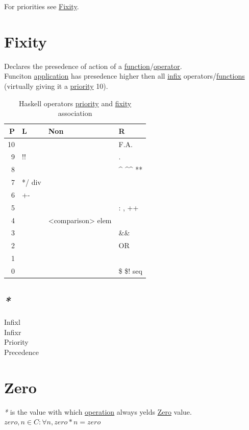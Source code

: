 \documentclass[a4paper,14pt,oneside]{book}
\begin{document}
For priorities see \hyperref[org02a84e2]{Fixity}.\\

\section{\label{org02a84e2}Fixity}
\label{sec:org932e651}
Declares the presedence of action of a \hyperref[org13e0181]{function}/\hyperref[org6dec081]{operator}.\\

Funciton \hyperref[orgbc1fe73]{application} has presedence higher then all \hyperref[org87504c8]{infix} operators/\hyperref[org41df67c]{functions} (virtually giving it a \hyperref[orgb5ff9f2]{priority} 10).\\

\begin{table}[htbp]
\caption{\label{tab--haskell-operator-priority-fixity-association}Haskell operators \hyperref[orgb5ff9f2]{priority} and \hyperref[org02a84e2]{fixity} association}
\centering
\begin{tabular}{rlll}
P & L & Non & R\\
\hline
10 &  &  & F.A.\\
9 & !! &  & .\\
8 &  &  & \^{} \^{}\^{} **\\
7 & */ div &  & \\
6 & +- &  & \\
5 &  &  & : , ++\\
4 &  & <comparison> elem & \\
3 &  &  & \&\&\\
2 &  &  & OR\\
1 &  &  & \\
0 &  &  & \$ \$! seq\\
\end{tabular}
\end{table}

\subsection{\emph{*}}
\label{sec:org529fc65}

\label{orge62d29c}Infixl\\
\label{orgb41722f}Infixr\\
\label{orgb5ff9f2}Priority\\
\label{orgda758c1}Precedence\\

\section{\label{orgc9ef374}Zero}
\label{sec:org493f362}
\emph{*} is the value with which \hyperref[org2201dac]{operation} always yelds \hyperref[orgc9ef374]{Zero} value.\\
\(zero, n \in C : \forall n, zero*n=zero\)\\
\end{document}
